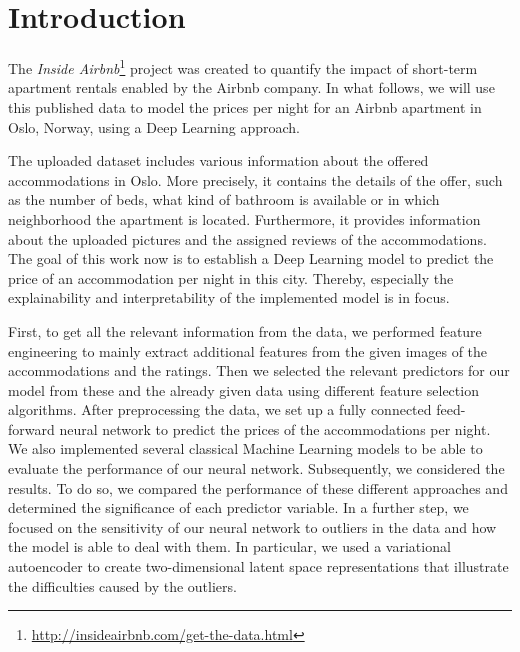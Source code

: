 \section{Introduction}


The \emph{Inside Airbnb}\footnote{\url{http://insideairbnb.com/get-the-data.html}} project \citep{cox2022} was created to quantify the impact of short-term apartment rentals enabled by the Airbnb company.
In what follows, we will use this published data to model the prices per night for an Airbnb apartment in Oslo, Norway, using a Deep Learning approach.

The uploaded dataset includes various information about the offered accommodations in Oslo. More precisely, it contains the details of the offer, such as the number of beds, what kind of bathroom is available or in which neighborhood the apartment is located. Furthermore, it provides information about the uploaded pictures and the assigned reviews of the accommodations.
The goal of this work now is to establish a Deep Learning model to predict the price of an accommodation per night in this city. Thereby, especially the explainability and interpretability of the implemented model is in focus.

First, to get all the relevant information from the data, we performed feature engineering to mainly extract additional features from the given images of the accommodations and the ratings. Then we selected the relevant predictors for our model from these and the already given data using different feature selection algorithms. After preprocessing the data, we set up a fully connected feed-forward neural network to predict the prices of the accommodations per night. We also implemented several classical Machine Learning models to be able to evaluate the performance of our neural network.
Subsequently, we considered the results. To do so, we compared the performance of these different approaches and determined the significance of each predictor variable. In a further step, we focused on the sensitivity of our neural network to outliers in the data and how the model is able to deal with them. In particular, we used a variational autoencoder to create two-dimensional latent space representations that illustrate the difficulties caused by the outliers.

